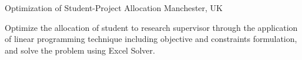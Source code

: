 \begin{cvprojects}
  \cvproject
    {} %
    {Optimization of Student-Project Allocation} %
    {Manchester, UK} %
    {} %
    {
      \begin{cvitems} %
        \item {Optimize the allocation of student to research supervisor through the application of linear programming technique
        including objective and constraints formulation, and solve the problem using Excel Solver.}
      \end{cvitems}
    }

\end{cvprojects}
